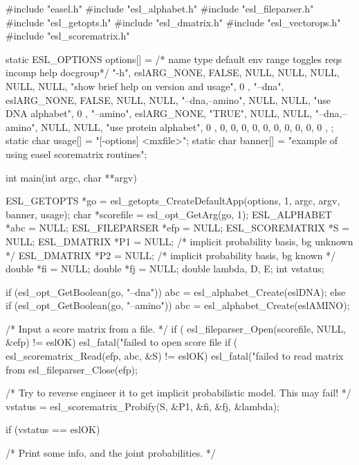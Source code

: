 \begin{cchunk}
#include "easel.h"
#include "esl_alphabet.h"
#include "esl_fileparser.h"
#include "esl_getopts.h"
#include "esl_dmatrix.h"
#include "esl_vectorops.h"
#include "esl_scorematrix.h"

static ESL_OPTIONS options[] = {
  /* name             type          default  env  range    toggles          reqs incomp  help                                       docgroup*/
  { "-h",          eslARG_NONE,       FALSE,  NULL, NULL,  NULL,             NULL, NULL, "show brief help on version and usage",        0 },
  { "--dna",       eslARG_NONE,       FALSE,  NULL, NULL,  "--dna,--amino",  NULL, NULL, "use DNA alphabet",                            0 },
  { "--amino",     eslARG_NONE,      "TRUE",  NULL, NULL,  "--dna,--amino",  NULL, NULL, "use protein alphabet",                        0 },
  {  0, 0, 0, 0, 0, 0, 0, 0, 0, 0 },
};
static char usage[]  = "[-options] <mxfile>";
static char banner[] = "example of using easel scorematrix routines";


int 
main(int argc, char **argv)
{
  ESL_GETOPTS     *go        = esl_getopts_CreateDefaultApp(options, 1, argc, argv, banner, usage);
  char            *scorefile = esl_opt_GetArg(go, 1);
  ESL_ALPHABET    *abc       = NULL;
  ESL_FILEPARSER  *efp       = NULL;
  ESL_SCOREMATRIX *S         = NULL;
  ESL_DMATRIX     *P1        = NULL; /* implicit probability basis, bg unknown */
  ESL_DMATRIX     *P2        = NULL; /* implicit probability basis, bg known   */
  double          *fi        = NULL;
  double          *fj        = NULL;
  double           lambda, D, E;
  int              vstatus;

  if      (esl_opt_GetBoolean(go, "--dna"))   abc = esl_alphabet_Create(eslDNA);
  else if (esl_opt_GetBoolean(go, "--amino")) abc = esl_alphabet_Create(eslAMINO);

  /* Input a score matrix from a file. */
  if ( esl_fileparser_Open(scorefile, NULL, &efp) != eslOK) esl_fatal("failed to open score file %
  if ( esl_scorematrix_Read(efp, abc, &S)         != eslOK) esl_fatal("failed to read matrix from %
  esl_fileparser_Close(efp);

  /* Try to reverse engineer it to get implicit probabilistic model. This may fail! */
  vstatus = esl_scorematrix_Probify(S, &P1, &fi, &fj, &lambda);

  if (vstatus == eslOK) 
    { /* Print some info, and the joint probabilities. */

}}
\end{cchunk}
